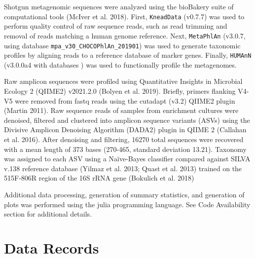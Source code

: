 \documentclass[fleqn,10pt]{wlscirep}
\begin{document}
Shotgun metagenomic sequences were analyzed using the bioBakery suite of computational tools (McIver et al. 2018).
First, \verb|KneadData| (v0.7.7) was used to perform quality control of raw sequence reads,
such as read trimming and removal of reads matching a human genome reference.
Next, \verb|MetaPhlAn| (v3.0.7, using database \verb|mpa_v30_CHOCOPhlAn_201901|) was used to generate taxonomic profiles
by aligning reads to a reference database of marker genes.
Finally, \verb|HUMAnN| (v3.0.0a4 with databases ) was used to functionally profile the metagenomes.

Raw amplicon sequences were profiled using Quantitative Insights in Microbial Ecology 2 (QIIME2) v2021.2.0 (Bolyen et al. 2019).
Briefly, primers flanking V4-V5 were removed from fastq reads using the cutadapt (v3.2) QIIME2 plugin (Martin 2011).
Raw sequence reads of samples from enrichment cultures were denoised, filtered and clustered into amplicon sequence variants (ASVs) using the Divisive Amplicon Denoising Algorithm (DADA2) plugin in QIIME 2 (Callahan et al. 2016).
After denoising and filtering, 16270 total sequences were recovered with a mean length of 373 bases (270-465, standard deviation 13.21).
Taxonomy was assigned to each ASV using a Naïve-Bayes classifier compared against SILVA v.138 reference database (Yilmaz et al. 2013; Quast et al. 2013) trained on the 515F-806R region of the 16S rRNA gene (Bokulich et al. 2018)

Additional data processing, generation of summary statistics, and generation of plots was performed using the julia programming language.
See Code Availability section for additional details.

\section*{Data Records}

\end{document}
